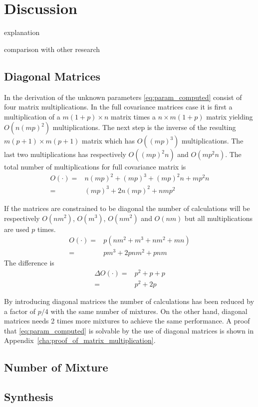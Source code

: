 \chapter{Discussion} %
\label{cha:discussion}
explanation

comparison with other research

\section{Diagonal Matrices} %
\label{sec:diagonal_matrices}
In the derivation of the unknown parameters \eqref{eq:param_computed} consist of four matrix multiplications. In the full covariance matrices case it is first a multiplication of a $m(1+p)\times n$ matrix times a $n\times m(1+p)$ matrix yielding $O(n(mp)^2)$ multiplications. The next step is the inverse of the resulting $m(p+1)\times m(p+1)$ matrix which has $O((mp)^3)$ multiplications. The last two multiplications has respectively $O((mp)^2n)$ and $O(mp^2n)$. The total number of multiplications for full covariance matrix is
\begin{equation}
	\begin{split}
		O(\cdot) = & n(mp)^2 + (mp)^3 + (mp)^2n + mp^2n \\
		= & (mp)^3 + 2n(mp)^2 + nmp^2
	\end{split}
\end{equation}

If the matrices are constrained to be diagonal the number of calculations will be respectively $O(nm^2)$, $O(m^3)$, $O(nm^2)$ and $O(nm)$ but all multiplications are used $p$ times.
\begin{equation}
	\begin{split}
		O(\cdot) = & p(nm^2 + m^3 + nm^2 + mn) \\
		= & pm^3 + 2pnm^2 + pnm
	\end{split}
\end{equation}
The difference is
\begin{equation}
	\begin{split}
		\Delta O(\cdot) = & p^2 + p + p \\
		= & p^2 +2p
	\end{split}
\end{equation}

By introducing diagonal matrices the number of calculations has been reduced by a factor of $p/4$ \cite{stylianou98} with the same number of mixtures. On the other hand, diagonal matrices needs 2 times more mixtures to achieve the same performance. A proof that \eqref{eq:param_computed} is solvable by the use of diagonal matrices is shown in Appendix~\ref{cha:proof_of_matrix_multiplication}. 



\section{Number of Mixture} %
\label{sec:number_of_mixture}


\section{Synthesis} %
\label{sec:synthesis}

